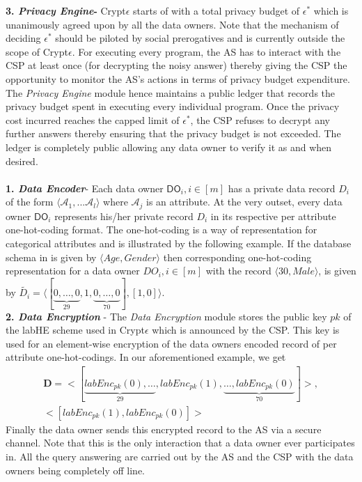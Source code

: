 \textbf{3. \textit{ Privacy Engine}-} Crypt$\epsilon$ starts of with a total privacy budget of $\epsilon^*$ which is unanimously agreed upon by all the data owners. Note that the mechanism of deciding $\epsilon^*$ should be piloted by social prerogatives \cite{e1,e2} 
and is currently outside the scope of Crypt$\epsilon$. For executing every program, the \textsf{AS} has to interact with the \textsf{CSP} at least once (for decrypting the noisy answer) thereby giving the \textsf{CSP} the opportunity to monitor the \textsf{AS}'s actions in terms of privacy budget expenditure. The \textit{Privacy Engine} module hence maintains a public ledger that records the privacy budget spent in executing every individual program. Once the privacy cost incurred reaches the capped limit of $\epsilon^*$, the \textsf{CSP} refuses to decrypt any further answers thereby ensuring that the privacy budget is not exceeded.  The ledger is completely public allowing any data owner to verify it as and when desired.\\
\\
\textbf{1. \textit{Data Encoder}}-  Each data owner $\textsf{DO}_i, i \in [m]$ has a private data record $D_i$ of the form $\langle \mathcal{A}_1,...\mathcal{A}_l\rangle$ where $\mathcal{A}_j$ is an attribute. At the very outset, every data owner  $\textsf{DO}_i$ represents his/her private record $D_i$ in its respective per attribute one-hot-coding format. The one-hot-coding is a way of representation for categorical attributes and is illustrated by the following example. 
If the database schema in \system is given by  $\langle Age,Gender\rangle$ then corresponding one-hot-coding representation for a data owner $DO_i, i \in [m]$ with the record $\langle 30, Male\rangle$, is given by $\tilde{D_i}=\langle[\underbrace{0,\ldots,0}_{29},1,\underbrace{0,\ldots,0}_{70}],[1,0]\rangle$. \\
\textbf{2. \textit{Data Encryption}} - The \textit{Data Encryption} module stores the public key $pk$ of the labHE scheme used in Crypt$\epsilon$ which is announced by the CSP. This key is used for an element-wise encryption of the data owners encoded record of per attribute one-hot-codings. In our aforementioned example, we get \begin{gather*}\mathbf{D}=<[\underbrace{labEnc_{pk}(0),\ldots}_{29},labEnc_{pk}(1),\underbrace{\ldots,labEnc_{pk}(0)}_{70}]>,\\
<[labEnc_{pk}(1),labEnc_{pk}(0)]>\end{gather*} Finally the data owner sends this encrypted record to the AS via a secure channel. Note that this is the only interaction that a data owner ever participates in. All the query answering are carried out by the \textsf{AS} and the \textsf{CSP} with the data owners being completely off line.\\
